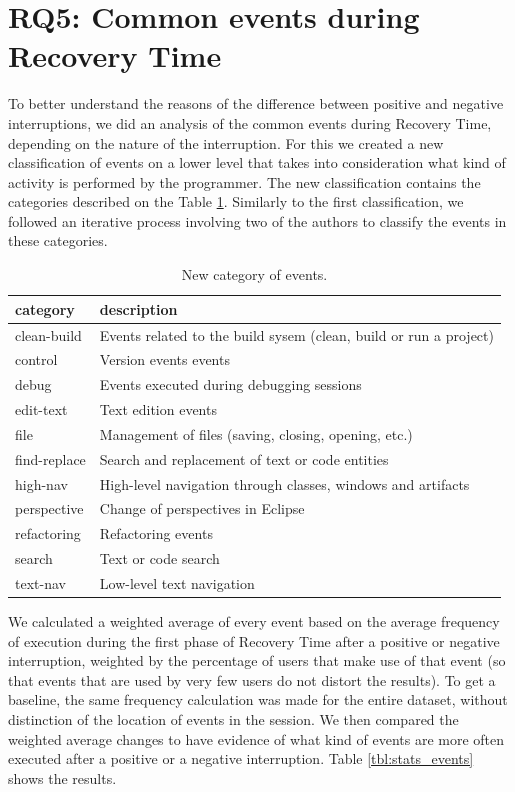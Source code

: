 \documentclass[times]{smrauth}
\begin{document}
\section{RQ5: Common events during Recovery Time}

To better understand the reasons of the difference between positive and negative interruptions, we did an analysis of the common events during Recovery Time, depending on the nature of the interruption. For this we created a new classification of events on a lower level that takes into consideration what kind of activity is performed by the programmer. The new classification contains the categories described on the Table \ref{tbl:new_events_udc}. Similarly to the first classification, we followed an iterative process involving two of the authors to classify the events in these categories. 

\begin{table}[ht!]
\renewcommand{\arraystretch}{1.3}
\caption{New category of events. }
\label{tbl:new_events_udc}
\centering
\begin{tabular}{|p{2.5cm}|p{9 cm}|} 
  \hline 
category & description \\  
  \hline 
    \hline 
clean-build &  Events related to the build sysem (clean, build or run a project) \\
control & Version events events \\
debug & Events executed during debugging sessions  \\
edit-text & Text edition events  \\
file & Management of files (saving, closing, opening, etc.)  \\
find-replace & Search and replacement of text  or code entities \\
high-nav & High-level navigation through classes, windows and artifacts \\
perspective & Change of perspectives in Eclipse  \\
refactoring & Refactoring events \\
search & Text or code search  \\
text-nav & Low-level text navigation \\

\hline
\end{tabular}
\end{table}

We calculated a weighted average of every event based on the average frequency of execution during the first phase of Recovery Time after a positive or negative interruption, weighted by the percentage of users that make use of that event (so that events that are used by very few users do not distort the results). To get a baseline, the same frequency calculation was made for the entire dataset, without distinction of the location of events in the session. We then compared the weighted average changes to have evidence of what kind of events are more often executed after a positive or a negative interruption. Table \ref{tbl:stats_events} shows the results.
\end{document}
